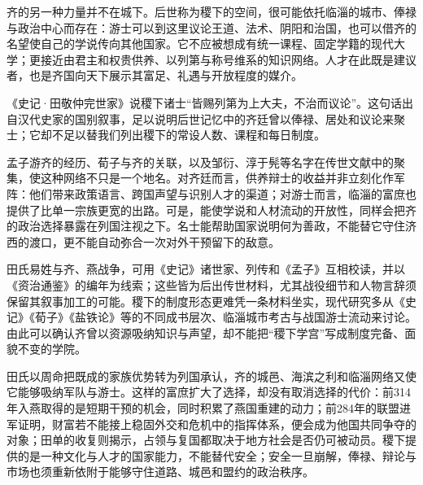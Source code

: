 齐的另一种力量并不在城下。后世称为稷下的空间，很可能依托临淄的城市、俸禄与政治中心而存在：游士可以到这里议论王道、法术、阴阳和治国，也可以借齐的名望使自己的学说传向其他国家。它不应被想成有统一课程、固定学籍的现代大学；更接近由君主和权贵供养、以列第与称号维系的知识网络。人才在此既是建议者，也是齐国向天下展示其富足、礼遇与开放程度的媒介。

\begin{textwindow}[《史记》笔下的稷下]
《史记·田敬仲完世家》说稷下诸士“皆赐列第为上大夫，不治而议论”。这句话出自汉代史家的国别叙事，足以说明后世记忆中的齐廷曾以俸禄、居处和议论来聚士；它却不足以替我们列出稷下的常设人数、课程和每日制度。
\end{textwindow}

孟子游齐的经历、荀子与齐的关联，以及邹衍、淳于髡等名字在传世文献中的聚集，使这种网络不只是一个地名。对齐廷而言，供养辩士的收益并非立刻化作军阵：他们带来政策语言、跨国声望与识别人才的渠道；对游士而言，临淄的富庶也提供了比单一宗族更宽的出路。可是，能使学说和人材流动的开放性，同样会把齐的政治选择暴露在列国注视之下。名士能帮助国家说明何为善政，不能替它守住济西的渡口，更不能自动弥合一次对外干预留下的敌意。

\begin{sourcenote}[材料的范围]
田氏易姓与齐、燕战争，可用《史记》诸世家、列传和《孟子》互相校读，并以《资治通鉴》的编年为线索；这些皆为后出传世材料，尤其战役细节和人物言辞须保留其叙事加工的可能。稷下的制度形态更难凭一条材料坐实，现代研究多从《史记》《荀子》《盐铁论》等的不同成书层次、临淄城市考古与战国游士流动来讨论。由此可以确认齐曾以资源吸纳知识与声望，却不能把“稷下学宫”写成制度完备、面貌不变的学院。
\end{sourcenote}

\begin{turningpoint}
田氏以周命把既成的家族优势转为列国承认，齐的城邑、海滨之利和临淄网络又使它能够吸纳军队与游士。这样的富庶扩大了选择，却没有取消选择的代价：前314年入燕取得的是短期干预的机会，同时积累了燕国重建的动力；前284年的联盟进军证明，财富若不能接上稳固外交和危机中的指挥体系，便会成为他国共同争夺的对象；田单的收复则揭示，占领与复国都取决于地方社会是否仍可被动员。稷下提供的是一种文化与人才的国家能力，不能替代安全；安全一旦崩解，俸禄、辩论与市场也须重新依附于能够守住道路、城邑和盟约的政治秩序。
\end{turningpoint}
